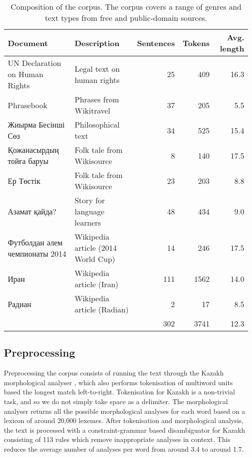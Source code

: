 \documentclass[a4paper,11pt, onecolumn,twoside]{article}
\begin{document}
\begin{table}[htbp]
  \centering
\begin{small}
  \begin{tabular}{|l|l|r|r|r|}
    \hline
    \textbf{Document} & \textbf{Description} & \textbf{Sentences} & \textbf{Tokens} & \textbf{Avg. length}\\
    \hline
    UN Declaration on Human Rights & Legal text on human rights & 25 & 409 & 16.3 \\
    Phrasebook                     & Phrases from Wikitravel   & 37 & 205 & 5.5 \\
    Жиырма Бесінші Сөз             & Philosophical text        & 34 & 525 & 15.4 \\ 
    Қожанасырдың тойға баруы       & Folk tale from Wikisource  & 8 & 140 & 17.5 \\
    Ер Төстік                      & Folk tale from Wikisource  & 23 & 203 & 8.8 \\
    Азамат қайда?                  & Story for language learners & 48 & 434 & 9.0 \\
    Футболдан әлем чемпионаты 2014 & Wikipedia article (2014 World Cup) & 14 & 246 & 17.5 \\
    Иран & Wikipedia article (Iran)                                & 111 & 1562 & 14.0 \\
    Радиан & Wikipedia article (Radian)                            & 2 & 17 & 8.5 \\
    \hline
    \multicolumn{2}{c|}{~} & 302 & 3741 & 12.3 \\\cline{3-5}
  \end{tabular}
\end{small}
  \caption{Composition of the corpus. The corpus covers a range of genres and text types from 
    free and public-domain sources.}
\end{table}


\subsection{Preprocessing}

Preprocessing the corpus consists of running the text through the Kazakh morphological
analyser \parencite{Washington14}, which also performs tokenisation of multiword units based 
the longest match left-to-right. Tokenisation for Kazakh is a non-trivial task, and so
we do not simply take space as a delimiter. The morphological analyser returns all 
the possible morphological analyses for each word based on a lexicon of around 20,000 lexemes.
After tokenisation and morphological analysis, the text is processed with a constraint-grammar 
based disambiguator for Kazakh consisting of 113 rules which remove inappropriate 
analyses in context. This reduces the average number of analyses per word from around 3.4
to around 1.7.
\end{document}

